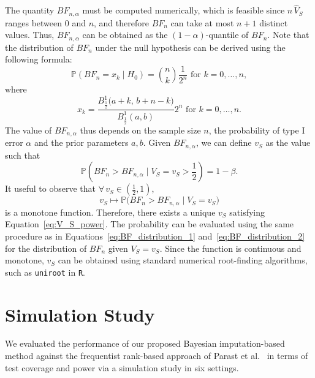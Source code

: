 \documentclass[12pt]{article}
\begin{document}
The quantity \(BF_{n, \alpha}\) must be computed numerically, which is feasible since \(n \, \widehat{V}_{S}\) ranges between \(0\) and \(n\), and therefore \(BF_{n}\) can take at most \(n + 1\) distinct values. Thus, \(BF_{n, \alpha}\) can be obtained as the \((1 - \alpha)\)-quantile of \(BF_{n}\). Note that the distribution of \(BF_{n}\) under the null hypothesis can be derived using the following formula:
\begin{equation}
    \mathbb{P} (BF_{n} = x_{k} \mid H_0) = \binom{n}{k} \frac{1}{2^{n}} \text{ for } k = 0, \ldots, n,
    \label{eq:BF_distribution_1}
\end{equation}
where
\begin{equation}
    x_{k} = \frac{B_{\frac{1}{2}}^{1}\big(a + k, \, b + n - k \big)}{B_{\frac{1}{2}}^{1}(a, b)} 2^n \text{ for } k = 0, \ldots, n.
    \label{eq:BF_distribution_2}
\end{equation}
The value of $BF_{n, \alpha}$ thus depends on the sample size $n$, the probability of type I error \( \alpha \) and the prior parameters $a, b$. 
Given $BF_{n, \alpha}$, we can define $v_{S}$ as the value such that
\begin{equation}
    \mathbb{P} \left( BF_{n} > BF_{n, \alpha} \mid V_{S} = v_{S} > \frac{1}{2} \right) = 1 - \beta.
    \label{eq:V_S_power}
\end{equation}
 It useful to observe that \(\forall \, v_{S} \in \left(\frac{1}{2}, 1\right)\),
\begin{equation}
v_{S} \mapsto \mathbb{P} \big( BF_{n} > BF_{n, \alpha} \mid V_S = v_{S} \big)
\end{equation}
is a monotone function. Therefore, there exists a unique \(v_{S}\) satisfying Equation~\eqref{eq:V_S_power}. The probability can be evaluated using the same procedure as in Equations~\eqref{eq:BF_distribution_1} and~\eqref{eq:BF_distribution_2} for the distribution of \(BF_{n}\) given \(V_S = v_{S}\). Since the function is continuous and monotone, \(v_{S}\) can be obtained using standard numerical root-finding algorithms, such as \texttt{uniroot} in \texttt{R}.

\section{Simulation Study}\label{sec:simulation_study}

We evaluated the performance of our proposed Bayesian imputation-based method against the frequentist rank-based approach of Parast et al.\ \citep{parast2024rank} in terms of test coverage and power via a simulation study in six settings.
\end{document}
